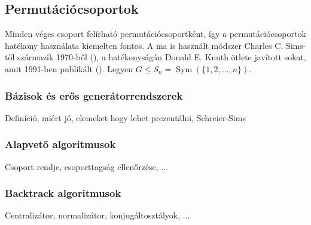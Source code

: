 \subsection{Permutációcsoportok}
\label{subsec:permutacio}
Minden véges csoport felírható permutációcsoportként, így a permutációcsoportok hatékony használata kiemelten fontos.
A ma is használt módszer Charles C. Sims-től származik 1970-ből (\cite{Sim70}), a hatékonyságán Donald E. Knuth ötlete javított sokat,
amit 1991-ben publikált (\cite{Knu91}).
Legyen $G \le S_n = \mathop{Sym}(\{1, 2, \dots, n\})$.

\subsubsection{Bázisok és erős generátorrendszerek}
Definíció, miért jó, elemeket hogy lehet prezentálni, Schreier-Sims

\subsubsection{Alapvető algoritmusok}
Csoport rendje, csoporttagság ellenőrzése, ...

\subsubsection{Backtrack algoritmusok}
Centralizátor, normalizátor, konjugáltosztályok, ...
